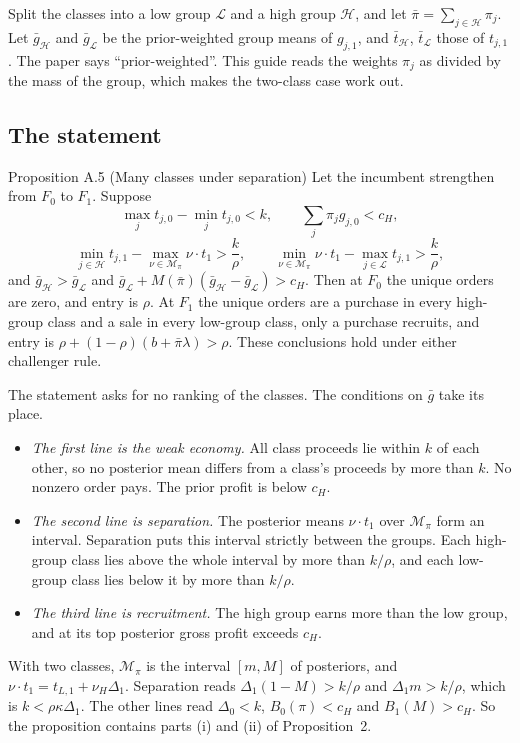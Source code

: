 Split the classes into a low group \(\mathcal L\) and a high group \(\mathcal H\), and let \(\bar\pi=\sum_{j\in\mathcal H}\pi_j\).
Let \(\bar g_{\mathcal H}\) and \(\bar g_{\mathcal L}\) be the prior-weighted group means of \(g_{j,1}\), and \(\bar t_{\mathcal H}\), \(\bar t_{\mathcal L}\) those of \(t_{j,1}\).
The paper says ``prior-weighted''. This guide reads the weights \(\pi_j\) as divided by the mass of the group, which makes the two-class case work out.

\subsection{The statement}

\begin{paperresult}{Proposition A.5 (Many classes under separation)}
Let the incumbent strengthen from \(F_0\) to \(F_1\). Suppose
\[
\max_jt_{j,0}-\min_jt_{j,0}<k,\qquad \sum_j\pi_jg_{j,0}<c_H,
\]
\[
\min_{j\in\mathcal H}t_{j,1}-\max_{\nu\in\mathcal M_\pi}\nu\cdot t_1>\frac k\rho,\qquad
\min_{\nu\in\mathcal M_\pi}\nu\cdot t_1-\max_{j\in\mathcal L}t_{j,1}>\frac k\rho,
\]
and \(\bar g_{\mathcal H}>\bar g_{\mathcal L}\) and \(\bar g_{\mathcal L}+M(\bar\pi)(\bar g_{\mathcal H}-\bar g_{\mathcal L})>c_H\).
Then at \(F_0\) the unique orders are zero, and entry is \(\rho\). At \(F_1\) the unique orders are a purchase in every high-group class and a sale in every low-group class, only a purchase recruits, and entry is \(\rho+(1-\rho)(b+\bar\pi\lambda)>\rho\). These conclusions hold under either challenger rule.
\end{paperresult}

The statement asks for no ranking of the classes. The conditions on \(\bar g\) take its place.
\begin{itemize}
\item \emph{The first line is the weak economy.} All class proceeds lie within \(k\) of each other, so no posterior mean differs from a class's proceeds by more than \(k\). No nonzero order pays. The prior profit is below \(c_H\).
\item \emph{The second line is separation.} The posterior means \(\nu\cdot t_1\) over \(\mathcal M_\pi\) form an interval. Separation puts this interval strictly between the groups. Each high-group class lies above the whole interval by more than \(k/\rho\), and each low-group class lies below it by more than \(k/\rho\).
\item \emph{The third line is recruitment.} The high group earns more than the low group, and at its top posterior gross profit exceeds \(c_H\).
\end{itemize}
With two classes, \(\mathcal M_\pi\) is the interval \([m,M]\) of posteriors, and \(\nu\cdot t_1=t_{L,1}+\nu_H\Delta_1\).
Separation reads \(\Delta_1(1-M)>k/\rho\) and \(\Delta_1m>k/\rho\), which is \(k<\rho\kappa\Delta_1\).
The other lines read \(\Delta_0<k\), \(B_0(\pi)<c_H\) and \(B_1(M)>c_H\).
So the proposition contains parts (i) and (ii) of Proposition~2.

